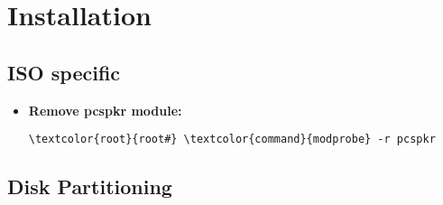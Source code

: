 \documentclass[10pt, a4paper, onecolumn, openany]{book} %
\begin{document}
\chapter{Installation}
\section{ISO specific}
\begin{itemize}
    \item \textbf{Remove pcspkr module:}
\begin{Verbatim}[commandchars=\\\{\}]
\textcolor{root}{root#} \textcolor{command}{modprobe} -r pcspkr
\end{Verbatim}
\end{itemize}
\section{Disk Partitioning}
\end{document}
